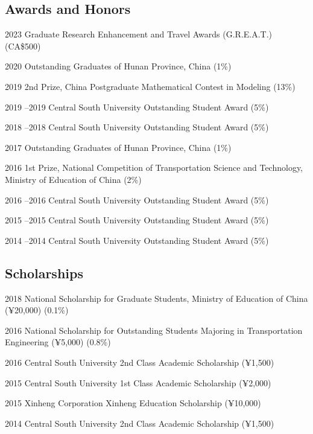 \documentclass[12pt,letterpaper]{report}
\begin{document}
    \subsection*{Awards and Honors}
    \begin{tablist}
        \item[2023] \tab Graduate Research Enhancement and Travel Awards (G.R.E.A.T.) (CA\$500)
        \item[2020]  Outstanding Graduates of Hunan Province, China (1\%)
        \item[2019] \tab 2nd Prize, China Postgraduate Mathematical Contest in Modeling (13\%)
        \item[2019] --2019 Central South University Outstanding Student Award (5\%)
        \item[2018] --2018 Central South University Outstanding Student Award (5\%)
        \item[2017]  Outstanding Graduates of Hunan Province, China (1\%)
        \item[2016] \tab 1st Prize, National Competition of Transportation Science and Technology, Ministry of Education of China (2\%)
        \item[2016] --2016 Central South University Outstanding Student Award (5\%)
        \item[2015] --2015 Central South University Outstanding Student Award (5\%)
        \item[2014] --2014 Central South University Outstanding Student Award (5\%)
    \end{tablist}

    \subsection*{Scholarships}
    \begin{tablist}
        \item[2018] \tab National Scholarship for Graduate Students, Ministry of Education of China (¥20,000) (0.1\%)
        \item[2016] \tab National Scholarship for Outstanding Students Majoring in Transportation Engineering (¥5,000) (0.8\%)
        \item[2016] \tab Central South University 2nd Class Academic Scholarship (¥1,500)
        \item[2015] \tab Central South University 1st Class Academic Scholarship (¥2,000)
        \item[2015] \tab Xinheng Corporation Xinheng Education Scholarship (¥10,000)
        \item[2014] \tab Central South University 2nd Class Academic Scholarship (¥1,500)
    \end{tablist}
\end{document}
